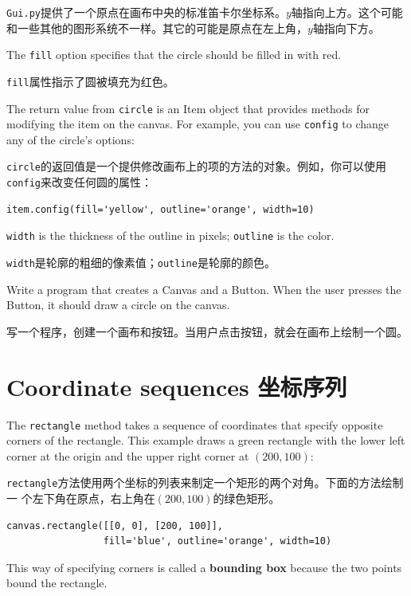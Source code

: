 \documentclass[10pt]{book}
\begin{document}
\begin{CJK}{UTF8}{gbsn}
{\tt Gui.py}提供了一个原点在画布中央的标准笛卡尔坐标系。$y$轴指向上方。这个可能
和一些其他的图形系统不一样。其它的可能是原点在左上角，$y$轴指向下方。

The {\tt fill} option specifies that the circle should be filled
in with red.

{\tt fill}属性指示了圆被填充为红色。

The return value from {\tt circle} is an Item object that
provides methods for modifying the item on the canvas.  For
example, you can use {\tt config} to change any of the circle's
options:

{\tt circle}的返回值是一个提供修改画布上的项的方法的对象。例如，你可以使用{\tt
config}来改变任何圆的属性：

\begin{verbatim}
item.config(fill='yellow', outline='orange', width=10)
\end{verbatim}
%
{\tt width} is the thickness of the outline in pixels;
{\tt outline} is the color.

{\tt width}是轮廓的粗细的像素值；{\tt outline}是轮廓的颜色。

\begin{exercise}
\label{circle}

Write a program that creates a Canvas and a Button.  When the
user presses the Button, it should draw a circle on the canvas.

写一个程序，创建一个画布和按钮。当用户点击按钮，就会在画布上绘制一个圆。

\end{exercise}


\section{Coordinate sequences 坐标序列}

The {\tt rectangle} method takes a sequence of coordinates that
specify opposite corners of the rectangle.  This example
draws a green rectangle with the lower left corner at the origin
and the upper right corner at $(200,100)$:

{\tt rectangle}方法使用两个坐标的列表来制定一个矩形的两个对角。下面的方法绘制一
个左下角在原点，右上角在$(200,100)$的绿色矩形。

\begin{verbatim}
canvas.rectangle([[0, 0], [200, 100]], 
                 fill='blue', outline='orange', width=10)
\end{verbatim}
%
This way of specifying corners is called
a {\bf bounding box} because the two points
bound the rectangle.


\end{CJK}
\end{document}
